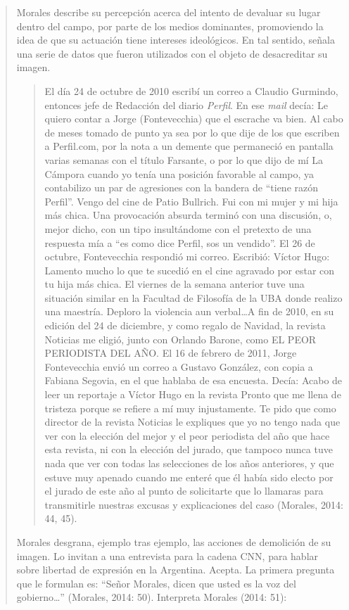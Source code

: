 \begin{quote}
Morales describe su percepción acerca del intento de devaluar su lugar dentro del campo, por parte de los medios dominantes, promoviendo la idea de que su actuación tiene intereses ideológicos. En tal sentido, señala una serie de datos que fueron utilizados con el objeto de desacreditar su imagen.

\begin{quote}
	El día 24 de octubre de 2010 escribí un correo a Claudio Gurmindo, entonces jefe de Redacción del diario \emph{Perfil}. En ese \emph{mail} decía: Le quiero contar a Jorge (Fontevecchia) que el escrache va bien. Al cabo de meses tomado de punto ya sea por lo que dije de los que escriben a Perfil.com, por la nota a un demente que permaneció en pantalla varias semanas con el título Farsante, o por lo que dijo de mí La Cámpora cuando yo tenía una posición favorable al campo, ya contabilizo un par de agresiones con la bandera de \enquote{tiene razón Perfil}. Vengo del cine de Patio Bullrich. Fui con mi mujer y mi hija más chica. Una provocación absurda terminó con una discusión, o, mejor dicho, con un tipo insultándome con el pretexto de una respuesta mía a \enquote{es como dice Perfil, sos un vendido}. El 26 de octubre, Fontevecchia respondió mi correo. Escribió: Víctor Hugo: Lamento mucho lo que te sucedió en el cine agravado por estar con tu hija más chica. El viernes de la semana anterior tuve una situación similar en la Facultad de Filosofía de la UBA donde realizo una maestría. Deploro la violencia aun verbal\dots A fin de 2010, en su edición del 24 de diciembre, y como regalo de Navidad, la revista Noticias me eligió, junto con Orlando Barone, como EL PEOR PERIODISTA DEL AÑO. El 16 de febrero de 2011, Jorge Fontevecchia envió un correo a Gustavo González, con copia a Fabiana Segovia, en el que hablaba de esa encuesta. Decía: Acabo de leer un reportaje a Víctor Hugo en la revista Pronto que me llena de tristeza porque se refiere a mí muy injustamente. Te pido que como director de la revista Noticias le expliques que yo no tengo nada que ver con la elección del mejor y el peor periodista del año que hace esta revista, ni con la elección del jurado, que tampoco nunca tuve nada que ver con todas las selecciones de los años anteriores, y que estuve muy apenado cuando me enteré que él había sido electo por el jurado de este año al punto de solicitarte que lo llamaras para transmitirle nuestras excusas y explicaciones del caso (Morales, 2014: 44, 45).
\end{quote}


Morales desgrana, ejemplo tras ejemplo, las acciones de demolición de su imagen. Lo invitan a una entrevista para la cadena CNN, para hablar sobre libertad de expresión en la Argentina. Acepta. La primera pregunta que le formulan es: \enquote{Señor Morales, dicen que usted es la voz del gobierno\dots} (Morales, 2014: 50). Interpreta Morales (2014: 51):


\end{quote}
